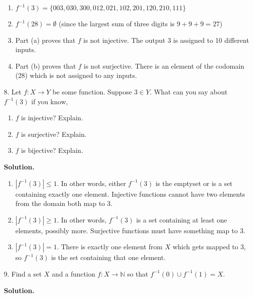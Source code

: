 \documentclass[10pt,]{book}
\theoremstyle{plain}
\theoremstyle{definition}
\theoremstyle{definition}
\theoremstyle{definition}
\numberwithin{equation}{section}
\def\N{\mathbb N}
\def\inv{^{-1}}
\begin{document}
\begin{exerciselist}
\leavevmode%
\begin{enumerate}[label=(\alph*)]
\item\hypertarget{li-335}{}\(f\inv(3) = \{003, 030, 300, 012, 021, 102, 201, 120, 210, 111\}\)%
\item\hypertarget{li-336}{}\(f\inv(28) = \emptyset\) (since the largest sum of three digits is \(9+9+9 = 27\))%
\item\hypertarget{li-337}{}
                Part (a) proves that \(f\) is not injective. The output 3 is assigned to 10 different inputs.
\item\hypertarget{li-338}{}
                Part (b) proves that \(f\) is not surjective. There is an element of the codomain (28) which is not assigned to any inputs.
\end{enumerate}
\item[8.]\hypertarget{exercise-34}{}
            Let \(f:X \to Y\) be some function. Suppose \(3 \in Y\). What can you say about \(f\inv(3)\) if you know,
\leavevmode%
\begin{enumerate}[label=(\alph*)]
\item\hypertarget{li-339}{}\(f\) is injective? Explain.%
\item\hypertarget{li-340}{}\(f\) is surjective? Explain.%
\item\hypertarget{li-341}{}\(f\) is bijective? Explain.%
\end{enumerate}
\par\smallskip
\par\smallskip
\noindent\textbf{Solution.}\hypertarget{solution-52}{}\quad
\leavevmode%
\begin{enumerate}[label=(\alph*)]
\item\hypertarget{li-342}{}\(|f\inv(3)| \le 1\). In other words, either \(f\inv(3)\) is the emptyset or is a set containing exactly one element. Injective functions cannot have two elements from the domain both map to 3.%
\item\hypertarget{li-343}{}\(|f\inv(3)| \ge 1\). In other words, \(f\inv(3)\) is a set containing at least one elements, possibly more. Surjective functions must have something map to 3.%
\item\hypertarget{li-344}{}\(|f\inv(3)| = 1\). There is exactly one element from \(X\) which gets mapped to 3, so \(f\inv(3)\) is the set containing that one element.%
\end{enumerate}
\item[9.]\hypertarget{exercise-35}{}
            Find a set \(X\) and a function \(f:X \to \N\) so that \(f\inv(0) \cup f\inv(1) = X\).
\par\smallskip
\par\smallskip
\noindent\textbf{Solution.}\hypertarget{solution-53}{}\quad


\end{exerciselist}
\end{document}
